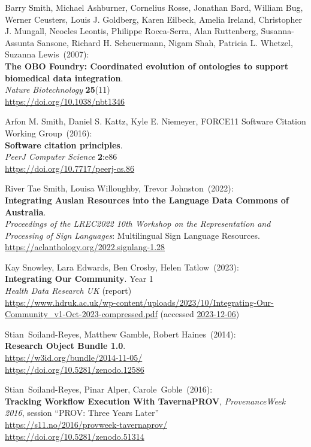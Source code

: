 \begin{thebibliography}{9}
Barry Smith, Michael Ashburner, Cornelius Rosse, Jonathan Bard, William Bug, Werner Ceusters, Louis J. Goldberg, Karen Eilbeck, Amelia Ireland, Christopher J. Mungall, Neocles Leontis, Philippe Rocca-Serra, Alan Ruttenberg, Susanna-Assunta Sansone, Richard H. Scheuermann, Nigam Shah, Patricia L. Whetzel, Suzanna Lewis~(2007): \\
\textbf{The {OBO Foundry}:
Coordinated evolution of ontologies to support biomedical data
integration}. \\
\emph{Nature Biotechnology} \textbf{25}(11) \\
\url{https://doi.org/10.1038/nbt1346}

Arfon M. Smith, Daniel S. Kattz, Kyle E. Niemeyer, FORCE11 Software Citation Working Group~(2016):\\
\textbf{Software citation principles}.\\
\emph{PeerJ Computer Science} \textbf{2}:e86\\
\url{https://doi.org/10.7717/peerj-cs.86}

River Tae Smith, Louisa Willoughby, Trevor Johnston~(2022): \\
\textbf{Integrating Auslan Resources into the Language Data Commons of Australia}.\\
\emph{Proceedings of the LREC2022 10th Workshop on the Representation and Processing of Sign Languages}: Multilingual Sign Language Resources.\\
\url{https://aclanthology.org/2022.signlang-1.28}

Kay Snowley, Lara Edwards, Ben Crosby, Helen Tatlow~(2023): \\
\textbf{Integrating Our Community}. Year 1 \\
\emph{Health Data Research UK} (report) \\
\url{https://www.hdruk.ac.uk/wp-content/uploads/2023/10/Integrating-Our-Community_v1-Oct-2023-compressed.pdf}
(accessed \href{}{2023-12-06})

Stian~Soiland-Reyes, Matthew Gamble, Robert Haines~(2014): \\
\textbf{Research Object Bundle 1.0}.\\
\url{https://w3id.org/bundle/2014-11-05/}\\
\url{https://doi.org/10.5281/zenodo.12586}

Stian~Soiland-Reyes, Pinar Alper, Carole~Goble~(2016): \\
\textbf{Tracking Workflow Execution With TavernaPROV},
\emph{ProvenanceWeek 2016}, session ``PROV: Three Years Later''\\
\url{https://s11.no/2016/provweek-tavernaprov/}\\
\url{https://doi.org/10.5281/zenodo.51314}


\end{thebibliography}
